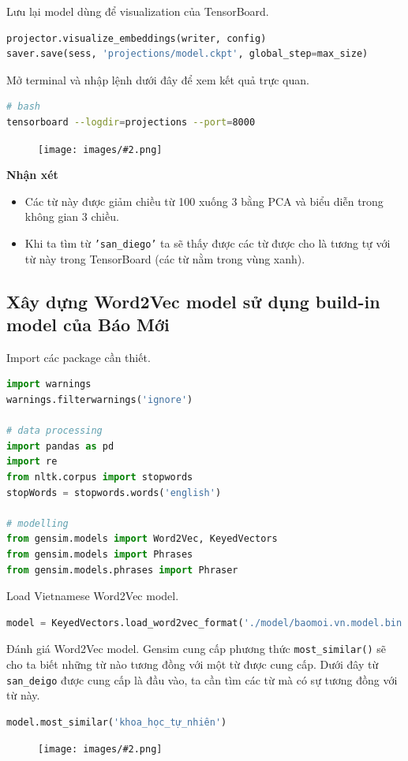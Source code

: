 \documentclass[12pt]{article}
\newcommand{\includeImage}[3]{
\begin{figure}[H]
  \centering
  \texttt{[image: images/\#2.png]}
  \def\temp{#3}\ifx\temp\empty\else\caption{#3}\fi
\end{figure}}
\begin{document}
\vskip 0.5cm
\indent Lưu lại model dùng để visualization của TensorBoard.
\begin{lstlisting}[language=python]
projector.visualize_embeddings(writer, config)
saver.save(sess, 'projections/model.ckpt', global_step=max_size)
\end{lstlisting}

\vskip 0.5cm
\indent Mở terminal và nhập lệnh dưới đây để xem kết quả trực quan.
\begin{lstlisting}[language=bash]
# bash
tensorboard --logdir=projections --port=8000
\end{lstlisting}
\includeImage{1}{24}{}

\begin{tcolorbox}[grow to left by=-0.6cm]
  \textbf{Nhận xét}
  \begin{itemize}
    \item Các từ này được giảm chiều từ 100 xuống 3 bằng PCA và biểu diễn trong không gian 3 chiều.
    \item Khi ta tìm từ \texttt{'san\_diego'} ta sẽ thấy được các từ được cho là tương tự với từ này trong TensorBoard (các từ nằm trong vùng xanh).
  \end{itemize}
\end{tcolorbox}



\subsection{Xây dựng Word2Vec model sử dụng build-in model của Báo Mới}
Import các package cần thiết.
\begin{lstlisting}[language=python]
import warnings
warnings.filterwarnings('ignore')

# data processing
import pandas as pd
import re
from nltk.corpus import stopwords
stopWords = stopwords.words('english')

# modelling
from gensim.models import Word2Vec, KeyedVectors
from gensim.models import Phrases
from gensim.models.phrases import Phraser
\end{lstlisting}

\vskip 0.5cm
\indent Load Vietnamese Word2Vec model.
\begin{lstlisting}[language=python]
  model = KeyedVectors.load_word2vec_format('./model/baomoi.vn.model.bin', binary=True)
\end{lstlisting}

\vskip 0.5cm
\indent Đánh giá Word2Vec model. Gensim cung cấp phương thức \texttt{most\_similar()} sẽ cho ta biết những từ nào tương đồng với một từ được cung cấp. Dưới đây từ \texttt{san\_deigo} được cung cấp là đầu vào, ta cần tìm các từ mà có sự tương đồng với từ này.
\begin{lstlisting}[language=python]
model.most_similar('khoa_học_tự_nhiên')
\end{lstlisting}
\includeImage{1}{25}{}
\end{document}
